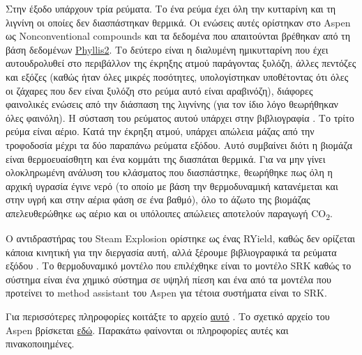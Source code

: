 \documentclass[11pt]{article}
\begin{document}
Στην έξοδο υπάρχουν τρία ρεύματα. Το ένα ρεύμα έχει όλη την κυτταρίνη και τη λιγνίνη οι οποίες δεν διασπάστηκαν θερμικά. Οι ενώσεις αυτές ορίστηκαν στο Aspen ως Nonconventional compounds και τα δεδομένα που απαιτούνται βρέθηκαν από τη βάση δεδομένων \href{https://phyllis.nl/Browse/Standard/ECN-Phyllis\#}{Phyllis2}. Το δεύτερο είναι η διαλυμένη ημικυτταρίνη που έχει αυτουδρολυθεί στο περιβάλλον της έκρηξης ατμού παράγοντας ξυλόζη, άλλες πεντόζες και εξόζες (καθώς ήταν όλες μικρές ποσότητες, υπολογίστηκαν υποθέτοντας ότι όλες οι ζάχαρες που δεν είναι ξυλόζη στο ρεύμα αυτό είναι αραβινόζη), διάφορες φαινολικές ενώσεις από την διάσπαση της λιγνίνης (για τον ίδιο λόγο θεωρήθηκαν όλες φαινόλη). Η σύσταση του ρεύματος αυτού υπάρχει στην βιβλιογραφία \cite{fernandez-bolanosSteamexplosionOliveStones2001} . Το τρίτο ρεύμα είναι αέριο. Κατά την έκρηξη ατμού, υπάρχει απώλεια μάζας από την τροφοδοσία μέχρι τα δύο παραπάνω ρεύματα εξόδου. Αυτό συμβαίνει διότι η βιομάζα είναι θερμοευαίσθητη και ένα κομμάτι της διασπάται θερμικά. Για να μην γίνει ολοκληρωμένη ανάλυση του κλάσματος που διασπάστηκε, θεωρήθηκε πως όλη η αρχική υγρασία έγινε νερό (το οποίο με βάση την θερμοδυναμική κατανέμεται και στην υγρή και στην αέρια φάση σε ένα βαθμό), όλο το άζωτο της βιομάζας απελευθερώθηκε ως αέριο και οι υπόλοιπες απώλειες αποτελούν παραγωγή CO\textsubscript{2}.

Ο αντιδραστήρας του Steam Explosion ορίστηκε ως ένας RYield, καθώς δεν ορίζεται κάποια κινητική για την διεργασία αυτή, αλλά ξέρουμε βιβλιογραφικά τα ρεύματα εξόδου \cite{fernandez-bolanosSteamexplosionOliveStones2001,fernandez-bolanosCharacterizationLigninObtained1999}. Το θερμοδυναμικό μοντέλο που επιλέχθηκε είναι το μοντέλο SRK καθώς το σύστημα είναι ένα χημικό σύστημα σε υψηλή πίεση και ένα από τα μοντέλα που προτείνει το method assistant του Aspen για τέτοια συστήματα είναι το SRK.

Για περισσότερες πληροφορίες κοιτάξτε το αρχείο \href{https://github.com/Vidianos-Giannitsis/Process-Design/blob/master/Aspen/steam\_explosion.org}{αυτό} . Το σχετικό αρχείο του Aspen βρίσκεται \href{https://github.com/Vidianos-Giannitsis/Process-Design/blob/master/Aspen/steam\_explosion\_3phases.apwz}{εδώ}. Παρακάτω φαίνονται οι πληροφορίες αυτές και πινακοποιημένες.

\pagebreak
\end{document}
